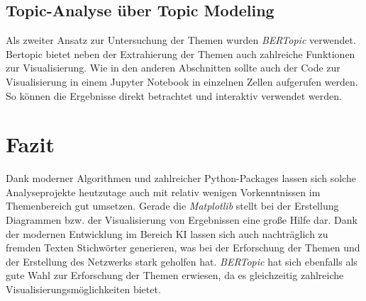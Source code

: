 \documentclass[12pt]{article}
\begin{document}
\begin{sloppypar}
	

	\subsection{Topic-Analyse über Topic Modeling}

	Als zweiter Ansatz zur Untersuchung der Themen wurden \emph{BERTopic}
	verwendet. Bertopic bietet neben der Extrahierung der Themen auch zahlreiche
	Funktionen zur Visualisierung. Wie in den anderen Abschnitten sollte auch
	der Code zur Visualisierung in einem Jupyter Notebook in einzelnen Zellen
	aufgerufen werden. So können die Ergebnisse direkt betrachtet und interaktiv
	verwendet werden.

	

	\section{Fazit}

	Dank moderner Algorithmen und zahlreicher Python-Packages lassen sich solche
	Analyseprojekte heutzutage auch mit relativ wenigen Vorkenntnissen im
	Themenbereich gut umsetzen. Gerade die \emph{Matplotlib} stellt bei der
	Erstellung Diagrammen bzw. der Visualisierung von Ergebnissen eine große
	Hilfe dar. Dank der modernen Entwicklung im Bereich KI lassen sich auch
	nachträglich zu fremden Texten Stichwörter generieren, was bei der
	Erforschung der Themen und der Erstellung des Netzwerks stark geholfen hat.
	\emph{BERTopic} hat sich ebenfalls als gute Wahl zur Erforschung der Themen
	erwiesen, da es gleichzeitig zahlreiche Visualisierungsmöglichkeiten bietet.

\end{sloppypar}
\end{document}
